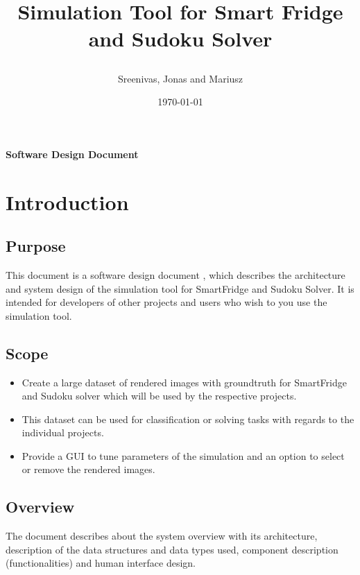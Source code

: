 \documentclass[a4paper,12pt]{article}
\begin{document}



\title{\begin{Huge}
\textbf{Simulation Tool for Smart Fridge and Sudoku Solver}
\end{Huge}}
\author{\begin{Large}
Sreenivas, Jonas and Mariusz
\end{Large}}
\date{\today}
\maketitle
\thispagestyle{empty}
\begin{center}
\begin{large}
\textbf{Software Design Document}
\end{large}
\end{center}
\newpage
\tableofcontents \newpage
{}
\section{Introduction}
\subsection{Purpose}
This document is a software design document , which describes the architecture and system design of the simulation tool for SmartFridge and Sudoku Solver. It is intended for developers of other projects and users who wish to you use the simulation tool.
\subsection{Scope}
\begin{itemize}
\item Create a large dataset of rendered images with groundtruth for SmartFridge and Sudoku solver which will be used by the respective projects.
\item This dataset can be used for classification or solving tasks with regards to the individual projects.
\item Provide a GUI to tune parameters of the simulation and an option to select or remove the rendered images.
\end{itemize}
\subsection{Overview}
The document describes about the system overview with its architecture, description of the data structures and data types used, component description (functionalities) and human interface design.
\end{document}
